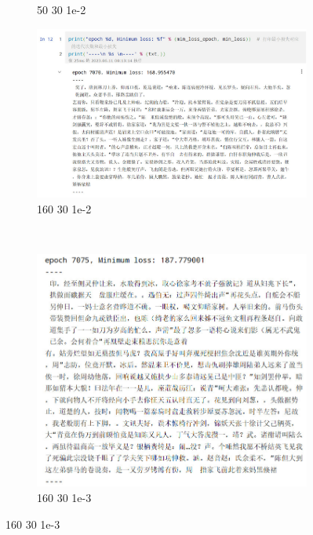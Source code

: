 \documentclass[letterpaper,12pt]{article}
\begin{document}
\begin{figure}[htbp]
\begin{subfigure}{0.45\textwidth}
					\captionsetup{font=scriptsize}
					\caption{50 30 1e-2}
					\label{fig: RNN_result_1}	
				\end{subfigure}
				\begin{subfigure}{0.45\textwidth}
					\includegraphics[width=\linewidth]{RNN/result_2}
					\captionsetup{font=scriptsize}
					\caption{160 30 1e-2}
					\label{fig: RNN_result_2}	
				\end{subfigure} \\
				\begin{subfigure}{0.45\textwidth}
					\includegraphics[width=\linewidth]{RNN/result_3}
					\captionsetup{font=scriptsize}
					\caption{160 30 1e-3}
					\label{fig: RNN_result_3}	
				\end{subfigure}

\end{figure}
\end{document}
